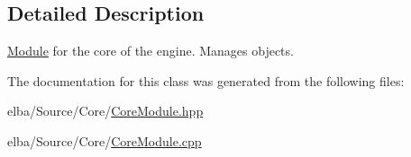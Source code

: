 \subsection{Detailed Description}
\mbox{\hyperlink{class_e_l_b_a_1_1_module}{Module}} for the core of the engine. Manages objects. 

The documentation for this class was generated from the following files\+:\begin{DoxyCompactItemize}
\item 
elba/\+Source/\+Core/\mbox{\hyperlink{_core_module_8hpp}{Core\+Module.\+hpp}}\item 
elba/\+Source/\+Core/\mbox{\hyperlink{_core_module_8cpp}{Core\+Module.\+cpp}}\end{DoxyCompactItemize}
